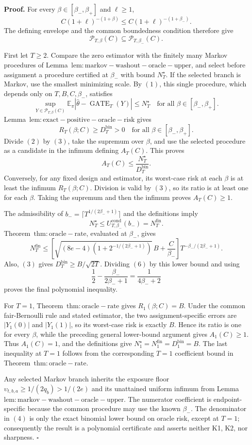 \textbf{Proof.} For every \(\beta\in[\beta_-,\beta_+]\) and \(\ell\ge1\),
\[
C(1+\ell)^{-(1+\beta)}\le C(1+\ell)^{-(1+\beta_-)}.
\]
The defining envelope and the common boundedness condition therefore give
\[
\mathcal P_{T,\beta}(C)\subseteq\mathcal P_{T,\beta_-}(C).
\tag{1}
\]

First let \(T\ge2\). Compare the zero estimator with the finitely many Markov procedures of Lemma~\(\mathrm{lem:markov-washout-oracle-upper}\), and select before assignment a procedure certified at \(\beta_-\) with bound \(N_T^\star\). If the selected branch is Markov, use the smallest minimizing scale. By \((1)\), this single procedure, which depends only on \(T,B,C,\beta_-\), satisfies
\[
\sup_{Y\in\mathcal P_{T,\beta}(C)}
\mathbb E_\pi\left|\widehat\theta-\operatorname{GATE}_T(Y)\right|
\le N_T^\star
\quad\text{for all }\beta\in[\beta_-,\beta_+].
\tag{2}
\]
Lemma~\(\mathrm{lem:exact-positive-oracle-risk}\) gives
\[
R_T(\beta;C)\ge D_T^{\mathrm{bin}}>0
\quad\text{for all }\beta\in[\beta_-,\beta_+].
\tag{3}
\]
Divide \((2)\) by \((3)\), take the supremum over \(\beta\), and use the selected procedure as a candidate in the infimum defining \(A_T(C)\). This proves
\[
A_T(C)\le\frac{N_T^\star}{D_T^{\mathrm{bin}}}.
\tag{4}
\]
Conversely, for any fixed design and estimator, its worst-case risk at each \(\beta\) is at least the infimum \(R_T(\beta;C)\). Division is valid by \((3)\), so its ratio is at least one for each \(\beta\). Taking the supremum and then the infimum proves \(A_T(C)\ge1\).

The admissibility of \(b_-=\lceil T^{1/(2\beta_-+1)}\rceil\) and the definitions imply
\[
N_T^\star\le U_{T,\beta_-}^{\mathrm{cond}}(b_-)=N_T^{\mathrm{fin}}.
\tag{5}
\]
Theorem~\(\mathrm{thm:oracle-rate}\), evaluated at \(\beta_-\), gives
\[
N_T^{\mathrm{fin}}
\le\left[\sqrt{(8e-4)\left(1+2^{-1/(2\beta_-+1)}\right)}\,B+\frac C{\beta_-}\right]T^{-\beta_-/(2\beta_-+1)}.
\tag{6}
\]
Also, \((3)\) gives \(D_T^{\mathrm{bin}}\ge B/\sqrt{2T}\). Dividing \((6)\) by this lower bound and using
\[
\frac12-\frac{\beta_-}{2\beta_-+1}=\frac1{4\beta_-+2}
\]
proves the final polynomial inequality.

For \(T=1\), Theorem~\(\mathrm{thm:oracle-rate}\) gives \(R_1(\beta;C)=B\). Under the common fair-Bernoulli rule and stated estimator, the two assignment-specific errors are \(|Y_1(0)|\) and \(|Y_1(1)|\), so its worst-case risk is exactly \(B\). Hence its ratio is one for every \(\beta\), while the preceding general lower-bound argument gives \(A_1(C)\ge1\). Thus \(A_1(C)=1\), and the definitions give \(N_1^\star=N_1^{\mathrm{fin}}=D_1^{\mathrm{bin}}=B\). The last inequality at \(T=1\) follows from the corresponding \(T=1\) coefficient bound in Theorem~\(\mathrm{thm:oracle-rate}\).

Any selected Markov branch inherits the exposure floor \(\upsilon_{t,b,a}\ge1/(2q_b)>1/(2e)\) and its unattained uniform infimum from Lemma~\(\mathrm{lem:markov-washout-oracle-upper}\). The numerator coefficient is endpoint-specific because the common procedure may use the known \(\beta_-\). The denominator in \((4)\) is only the exact binomial lower bound on oracle risk, except at \(T=1\); consequently the result is a polynomial certificate and asserts neither K1, K2, nor sharpness. \(\square\)